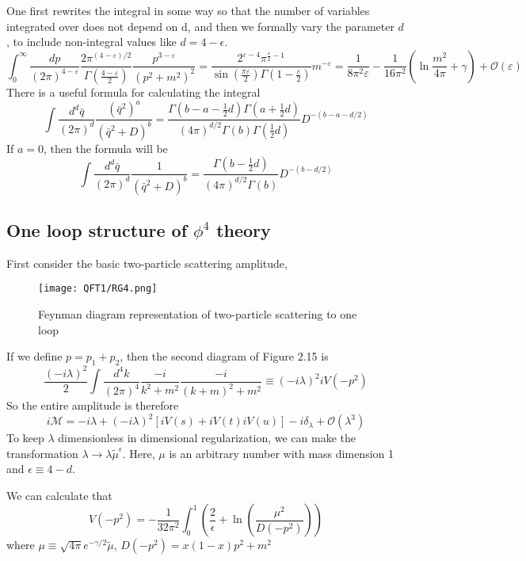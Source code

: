 One first rewrites the integral in some way so that the number of variables integrated over does not depend on d, and then we formally vary the parameter $d$, to include non-integral values like $d=4-\epsilon$.
\[\int _{0}^{\infty }{\frac {dp}{(2\pi )^{4-\varepsilon }}}{\frac {2\pi ^{(4-\varepsilon )/2}}{\Gamma \left({\frac {4-\varepsilon }{2}}\right)}}{\frac {p^{3-\varepsilon }}{\left(p^{2}+m^{2}\right)^{2}}}={\frac {2^{\varepsilon -4}\pi ^{{\frac {\varepsilon }{2}}-1}}{\sin({\frac {\pi \varepsilon }{2}})\Gamma (1-{\frac {\varepsilon }{2}})}}m^{-\varepsilon }={\frac {1}{8\pi ^{2}\varepsilon }}-{\frac {1}{16\pi ^{2}}}\left(\ln {\frac {m^{2}}{4\pi }}+\gamma \right)+{\mathcal {O}}(\varepsilon )\]
There is a useful formula for calculating the integral
\[\int \frac{d^d \bar{q}}{(2\pi)^{d}} \frac{(\bar{q}^2)^a}{(\bar{q}^2+D)^b} = \frac{\Gamma(b-a-\frac{1}{2}d) \Gamma(a+\frac{1}{2}d)}{(4\pi)^{d/2} \Gamma(b) \Gamma(\frac{1}{2}d)} D^{-(b-a-d/2)}\]
If $a=0$, then the formula will be
\[\int \frac{d^d \bar{q}}{(2\pi)^{d}} \frac{1}{(\bar{q}^2+D)^b} = \frac{\Gamma(b-\frac{1}{2}d)}{(4\pi)^{d/2} \Gamma(b)} D^{-(b-d/2)}\]

\subsection{One loop structure of $\phi^4$ theory}
First consider the basic two-particle scattering amplitude,
\begin{figure}[!h]
\centering
\texttt{[image: QFT1/RG4.png]}
\caption{Feynman diagram representation of two-particle scattering to one loop}
\end{figure}
If we define $p = p_1 + p_2$, then the second diagram of Figure 2.15 is
\[\frac{(-i\lambda)^2}{2} \int \frac{d^4k}{(2\pi)^4} \frac{-i}{k^2+m^2} \frac{-i}{(k+m)^2+m^2} \equiv (-i\lambda)^2 iV(-p^2)\]
So the entire amplitude is therefore
\[i\mathcal{M} = -i\lambda + (-i\lambda)^2 [iV(s) + iV(t) iV(u)] -i\delta_{\lambda} + \mathcal{O}(\lambda^3)\]
To keep $\lambda$ dimensionless in dimensional regularization, we can make the transformation $\lambda \to \lambda \tilde{\mu}^{\epsilon}$. Here, $\mu$ is an arbitrary number with mass dimension 1 and $\epsilon \equiv 4-d$. 

We can calculate that
\[V(-p^2) = -\frac{1}{32\pi^2} \int_0^1 (\frac{2}{\epsilon} + \ln(\frac{\mu^2}{D(-p^2)}))\]
where $\mu \equiv  \sqrt{4\pi} e^{-\gamma/2} \tilde{\mu}$, $D(-p^2) = x(1-x)p^2+m^2$

